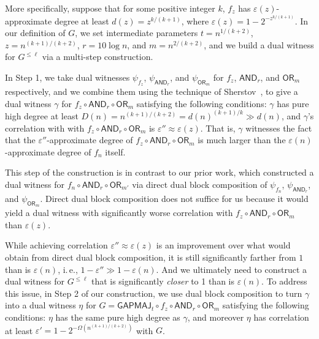 \documentclass[11pt]{article}
\numberwithin{equation}{section}
\theoremstyle{definition}
\theoremstyle{plain}
\newcommand{\ie}{i.\,e.}
\newcommand{\OR}{\mathsf{ OR}}
\newcommand{\GAPMAJ}{\mathsf{GAPMAJ}}
\newcommand{\eps}{\varepsilon}
\newcommand{\AND}{\mathsf{AND}}
\begin{document}
More specifically, suppose that for some positive integer $k$, $f_z$ has $\eps(z)$-approximate degree at least $d(z)=z^{k/(k+1)}$, where $\eps(z)=1-2^{-z^{k/(k+1)}}$. 
In our definition of $G$, we set intermediate parameters $t=n^{1/(k+2)}$, $z=n^{(k+1)/(k+2)}$, $r=10 \log n$, and $m=n^{2/(k+2)}$, and we build a dual witness
for $G^{\leq \ell}$ via a multi-step construction.

In Step 1, we take dual witnesses $\psi_{f_z}$, $\psi_{\AND_r}$, and $\psi_{\OR_m}$ for  $f_z$, $\AND_r$, and $\OR_{m}$
respectively, and we combine them 
using the technique of Sherstov~\cite{sherstovdp}, to give a dual witness $\gamma$ for $f_z \circ \AND_r \circ \OR_{m}$ satisfying
the following %
conditions: %
$\gamma$ has pure high degree 
at least $D(n)=n^{(k+1)/(k+2)} = d(n)^{(k+1)/k} \gg d(n)$, and $\gamma$'s correlation with  with $f_z \circ \AND_r \circ \OR_{m}$ is $\eps''\approx\eps(z)$. 
That is, $\gamma$ witnesses the fact that the $\eps''$-approximate degree of $f_z \circ \AND_r \circ \OR_{m}$ is much larger than 
the $\eps(n)$-approximate degree of $f_n$ itself. 

%
%
This step of the construction is in contrast to our prior work, which constructed a dual witness for $f_n \circ \AND_r \circ \OR_{m'}$
via direct dual block composition of $\psi_{f_n}$, $\psi_{\AND_r}$, and $\psi_{\OR_m}$. Direct dual block composition does
not suffice for us because it
would yield a dual witness with significantly worse correlation with $f_z \circ \AND_r \circ \OR_{m}$ than $\eps(z)$.

While achieving correlation $\eps'' \approx \eps(z)$ is an improvement over what would obtain
from direct dual block composition, it is still significantly farther from $1$ than is $\eps(n)$, \ie, $1-\eps'' \gg 1-\eps(n)$. And we ultimately
need to construct a dual witness for $G^{\leq \ell}$ that is significantly \emph{closer} to 1 than is $\eps(n)$.
To address this issue,
in Step 2 of our construction, we use dual block composition to turn $\gamma$ into a dual witness $\eta$ for $G=\GAPMAJ_t  \circ f_z \circ \AND_r \circ \OR_{m}$
satisfying the following %
conditions: %
$\eta$ has  the same pure high degree as $\gamma$, and moreover $\eta$ has
correlation at least $\eps'=1-2^{-\Omega(n^{(k+1)/(k+2)})}$ with $G$. 
\end{document}
